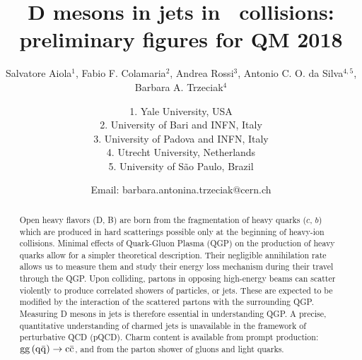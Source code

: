 \documentclass[ALICE,manyauthors]{ALICE_analysis_notes}
\begin{document}
%
%
%
\begin{titlepage}
%
\PHdate{\today}
%
\title{D mesons in jets in \pPb\ collisions: preliminary figures for QM 2018}
%
\author{Salvatore Aiola$^{1}$, Fabio F. Colamaria$^{2}$, Andrea Rossi$^{3}$, Antonio C. O. da Silva$^{4,5}$, Barbara A. Trzeciak$^{4}$}
\author{
1. Yale University, USA\\
2. University of Bari and INFN, Italy\\
3. University of Padova and INFN, Italy\\
4. Utrecht University, Netherlands\\
5. University of S\~ao Paulo, Brazil\\
}
\author{Email: barbara.antonina.trzeciak@cern.ch}
%
%
\begin{abstract}
Open heavy flavors (D, B) are born from the fragmentation of heavy quarks ($c$, $b$) which are produced in hard scatterings possible only at the beginning of heavy-ion collisions. Minimal effects of Quark-Gluon Plasma (QGP) on the production of heavy quarks allow for a simpler theoretical description. Their negligible annihilation rate allows us to measure them and study their energy loss mechanism during their travel through the QGP. 
Upon colliding, partons in opposing high-energy beams can scatter violently to produce correlated showers of particles, or jets. These are expected to be modified by the interaction of the scattered partons with the surrounding QGP. Measuring D mesons in jets is therefore essential in understanding QGP.
A precise, quantitative understanding of charmed jets is unavailable in the framework of perturbative QCD (pQCD). Charm content is available from prompt production: ${\rm gg\, (q\bar{q})} \rightarrow {\rm c\bar{c}}$, 
and from the parton shower of gluons and light quarks. %

\end{abstract}
\end{titlepage}
\end{document}

